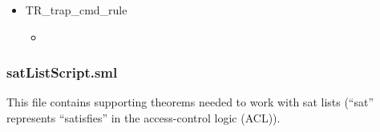 \begin{itemize}
\begin{itemize}
        (\HOLSymConst{,}\HOLSymConst{,})\\
         (   \\
            (   ( )\HOLSymConst{::})  ) \HOLSymConst{\HOLTokenConj{}}\\
       (\HOLSymConst{,}\HOLSymConst{,})   ( )
     \end{itemize}
     \item TR_trap_cmd_rule
  \begin{itemize}
    \item []
      \end{itemize}
    \end{itemize}

\subsubsection{satListScript.sml}
\label{sec:satlistscript.sml}

This file contains supporting theorems needed to work with sat lists (“sat” represents
“satisfies” in the access-control logic (ACL)).

